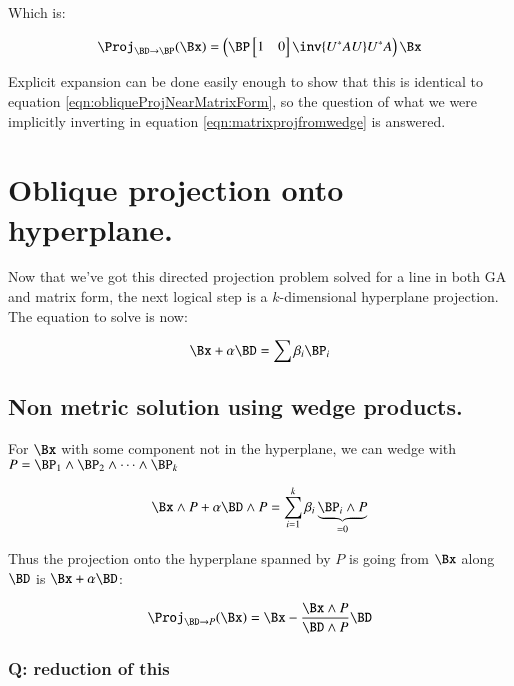 \documentclass{article}      %
\begin{document}
Which is:

\begin{equation}
\Proj_{\BD \rightarrow \BP}(\Bx) = 
\left(
\BP
\begin{bmatrix}
1 & 0 \\
\end{bmatrix}
\inv{U^* A U 
}
U^*
A
\right)
\Bx
\end{equation}

Explicit expansion can be done easily enough to show that this is identical to equation \ref{eqn:obliqueProjNearMatrixForm}, so
the question of what we were implicitly inverting in equation \ref{eqn:matrixprojfromwedge} is answered.

\section{ Oblique projection onto hyperplane. }

Now that we've got this directed projection problem solved for a line in both GA and matrix form, the next logical step is a $k$-dimensional hyperplane projection.  The equation to solve is now:

\begin{equation}\label{eqn:solveForprojPlane}
\Bx + \alpha \BD = \sum \beta_i \BP_i
\end{equation}

\subsection{ Non metric solution using wedge products. }

For $\Bx$ with some component not in the hyperplane, we can wedge with $P = \BP_1 \wedge \BP_2 \wedge \cdots \wedge \BP_k$

\begin{equation*}
\Bx \wedge P + \alpha \BD \wedge P = \sum_{i=1}^k \beta_i \underbrace{\BP_i \wedge P}_{=0}
\end{equation*}

Thus the projection onto the hyperplane spanned by $P$ is going from $\Bx$ along $\BD$ is $\Bx + \alpha \BD$:

\begin{equation}\label{eqn:GAhyperplaneProjection}
\Proj_{\BD \rightarrow P}(\Bx) = \Bx - \frac{\Bx \wedge P}{\BD \wedge P} \BD
\end{equation}

\subsubsection{ Q: reduction of this }
\end{document}
